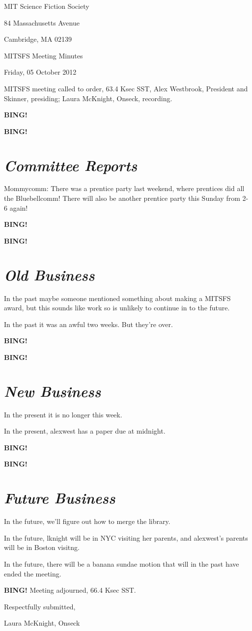\documentclass[10pt]{article}
\newcommand{\bing}{{\bf BING!} }
\newcommand{\goto}[1]{\bing \vskip 12pt \section*{{\em{#1}}}}
\newcommand{\skinner}{Alex Westbrook, President and Skinner}
\newcommand{\onseck}{Laura McKnight, Onseck}
\newcommand{\meetingdate}{Friday, 05 October 2012}
\begin{document}
\begin{center}

MIT Science Fiction Society

84 Massachusetts Avenue

Cambridge, MA 02139

\vspace{12pt}

MITSFS Meeting Minutes

\meetingdate

\end{center}

\vspace{18pt}

\setlength{\parskip}{6pt}

\noindent
MITSFS meeting called to order, 63.4 Ksec SST,
\skinner, presiding; \onseck, recording.


\bing

\goto{Committee Reports}

Mommycomm: There was a prentice party last weekend, where prentices did all the Bluebellcomm! There will also be another prentice party this Sunday from 2-6 again!

\bing

\goto{Old Business}

In the past maybe someone mentioned something about making a MITSFS award, but this sounds like work so is unlikely to continue in to the future. 

In the past it was an awful two weeks. But they're over.

\bing

\goto{New Business}

In the present it is no longer this week. 

In the present, alexwest has a paper due at midnight. 

\bing

\goto{Future Business}

In the future, we'll figure out how to merge the library. 

In the future, lknight will be in NYC visiting her parents, and alexwest's parents will be in Boston visitng.

In the future, there will be a banana sundae motion that will in the past have ended the meeting.

\bing
\noindent
Meeting adjourned, 66.4 Ksec SST.

\vspace{18pt}

\centerline{Respectfully submitted,}
\centerline{\onseck}
\end{document}
